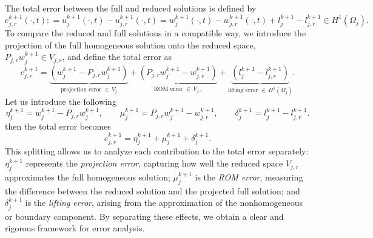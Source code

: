 \documentclass[a4paper, 11pt]{article}
\theoremstyle{remark}
\begin{document}
\noindent The total error between the full and reduced solutions is defined by
\begin{equation*}
    e_{j, r}^{k+1}(\cdot, t) : = u_{j}^{k+1}(\cdot, t) - u_{j, r}^{k+1}(\cdot, t) = w_{j}^{k+1}(\cdot, t) - w_{j, r}^{k+1}(\cdot, t) + l_{j}^{k+1} - l_{j, r}^{k+1}\in H^{1}(\Omega_{j}).
\end{equation*}
To compare the reduced and full solutions in a compatible way, we introduce the projection of the full homogeneous solution onto the reduced space, $P_{j,r} w_j^{k+1} \in V_{j,r}$, and define the total error as
\begin{equation*}
    e_{j, r}^{k+1} = \underbrace{\left(w_{j}^{k+1} - P_{j,r}w_{j}^{k+1}\right)}_{\text{projection error }\in\, V_{j}} + \underbrace{\left(P_{j,r}w_{j}^{k+1} - w_{j, r}^{k+1}\right)}_{\text{ROM error }\in\, V_{j, r}} + \underbrace{\left(l_{j}^{k+1} - l_{j, r}^{k+1}\right)}_{\text{lifting error }\in\, H^{1}(\Omega_{j})}.
\end{equation*}
Let us introduce the following
\begin{equation*}
    \eta_{j}^{k+1} = w_{j}^{k+1} - P_{j,r}w_{j}^{k+1}, \qquad \mu_{j}^{k+1} = P_{j,r}w_{j}^{k+1} - w_{j, r}^{k+1}, \qquad \delta_{j}^{k+1} = l_{j}^{k+1} - l_{j, r}^{k+1}.
\end{equation*}
then the total error becomes
\begin{equation*}
    e_{j, r}^{k+1} = \eta_{j}^{k+1} + \mu_{j}^{k+1} + \delta_{j}^{k+1}.
\end{equation*}
This splitting allows us to analyze each contribution to the total error separately: $\eta_{j}^{k+1}$ represents the \emph{projection error}, capturing how well the reduced space $V_{j,r}$ approximates the full homogeneous solution; $\mu_{j}^{k+1}$ is the \emph{ROM error}, measuring the difference between the reduced solution and the projected full solution; and $\delta_{j}^{k+1}$ is the \emph{lifting error}, arising from the approximation of the nonhomogeneous or boundary component. By separating these effects, we obtain a clear and rigorous framework for error analysis. 
\end{document}

